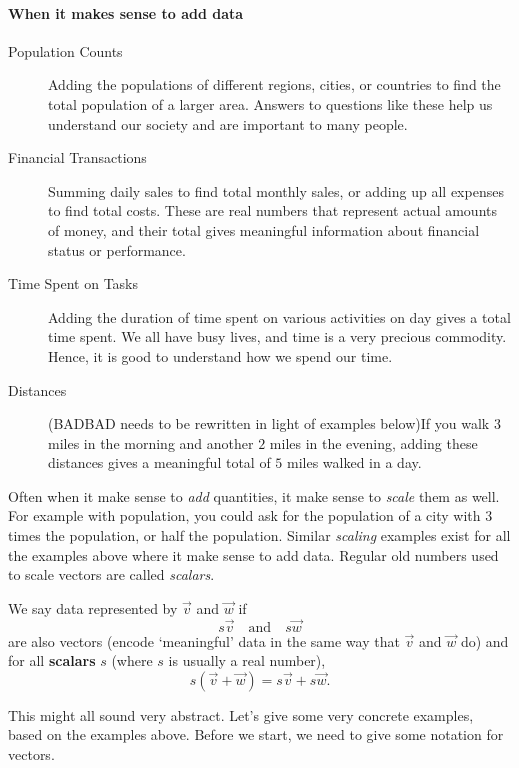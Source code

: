 \documentclass{ximera}
\begin{document}
\paragraph{When it makes sense to add data}
\begin{description}
\item[Population Counts] Adding the populations of different regions,
  cities, or countries to find the total population of a larger
  area. Answers to questions like these help us understand our
  society and are important to many people.
\item[Financial Transactions] Summing daily sales to find total
  monthly sales, or adding up all expenses to find total costs. These
  are real numbers that represent actual amounts of money, and their
  total gives meaningful information about financial status or
  performance.
\item[Time Spent on Tasks] Adding the duration of time spent on
  various activities on day gives a total time spent. We all have busy
  lives, and time is a very precious commodity. Hence, it is good to
  understand how we spend our time.
\item[Distances] (BADBAD needs to be rewritten in light of examples below)If you walk $3$ miles in the morning and another $2$
  miles in the evening, adding these distances gives a meaningful
  total of $5$ miles walked in a day.
\end{description}
Often when it make sense to \textit{add} quantities, it make sense to
\textit{scale} them as well. For example with population, you could
ask for the population of a city with $3$ times the population, or
half the population. Similar \textit{scaling} examples exist for all
the examples above where it make sense to add data. Regular old
numbers used to scale vectors are called \textit{scalars}.


\begin{definition}
  We say data represented by  $\vec{v}$ and $\vec{w}$ if
  \[
  s\vec{v}\quad\text{and}\quad s\vec{w}
  \]
  are also vectors (encode `meaningful' data in the same way that
  $\vec{v}$ and $\vec{w}$ do) and for all \textbf{scalars} $s$ (where $s$ is
  usually a real number),
  \[
  s(\vec{v} + \vec{w}) = s\vec{v}+ s\vec{w}.
  \]
\end{definition}
This might all sound very abstract. Let's give some very concrete
examples, based on the examples above. Before we start, we need to
give some notation for vectors.
\end{document}
